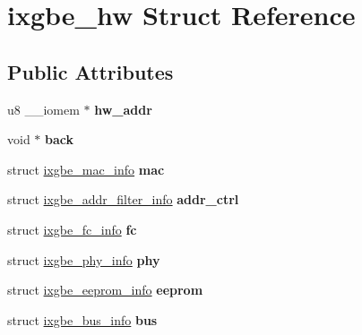 \hypertarget{structixgbe__hw}{
\section{ixgbe\_\-hw Struct Reference}
\label{structixgbe__hw}
}
\subsection*{Public Attributes}
\begin{DoxyCompactItemize}
\item 
\hypertarget{structixgbe__hw_a0e61d8fc4f720ceda3b9ef906fb90cb8}{
u8 \_\-\_\-iomem $\ast$ {\bfseries hw\_\-addr}}
\label{structixgbe__hw_a0e61d8fc4f720ceda3b9ef906fb90cb8}

\item 
\hypertarget{structixgbe__hw_a07293fdc886b8a1833d7fbe9125816f1}{
void $\ast$ {\bfseries back}}
\label{structixgbe__hw_a07293fdc886b8a1833d7fbe9125816f1}

\item 
\hypertarget{structixgbe__hw_a2c77aedc92d6ba10dec6b4536d5af587}{
struct \hyperlink{structixgbe__mac__info}{ixgbe\_\-mac\_\-info} {\bfseries mac}}
\label{structixgbe__hw_a2c77aedc92d6ba10dec6b4536d5af587}

\item 
\hypertarget{structixgbe__hw_a34cb728465c60a45d0d4bbbfe70bcfb0}{
struct \hyperlink{structixgbe__addr__filter__info}{ixgbe\_\-addr\_\-filter\_\-info} {\bfseries addr\_\-ctrl}}
\label{structixgbe__hw_a34cb728465c60a45d0d4bbbfe70bcfb0}

\item 
\hypertarget{structixgbe__hw_a67c3bca99547f9ef22ebf1befd3e07f2}{
struct \hyperlink{structixgbe__fc__info}{ixgbe\_\-fc\_\-info} {\bfseries fc}}
\label{structixgbe__hw_a67c3bca99547f9ef22ebf1befd3e07f2}

\item 
\hypertarget{structixgbe__hw_ad32e7a94bf2ad8fc7505e4d274df85c9}{
struct \hyperlink{structixgbe__phy__info}{ixgbe\_\-phy\_\-info} {\bfseries phy}}
\label{structixgbe__hw_ad32e7a94bf2ad8fc7505e4d274df85c9}

\item 
\hypertarget{structixgbe__hw_ab6482f323ff851b7a8ffa1a85ac250c5}{
struct \hyperlink{structixgbe__eeprom__info}{ixgbe\_\-eeprom\_\-info} {\bfseries eeprom}}
\label{structixgbe__hw_ab6482f323ff851b7a8ffa1a85ac250c5}

\item 
\hypertarget{structixgbe__hw_a57f5b5279433dd5b6e69cbcffd098986}{
struct \hyperlink{structixgbe__bus__info}{ixgbe\_\-bus\_\-info} {\bfseries bus}}
\label{structixgbe__hw_a57f5b5279433dd5b6e69cbcffd098986}


\end{DoxyCompactItemize}
